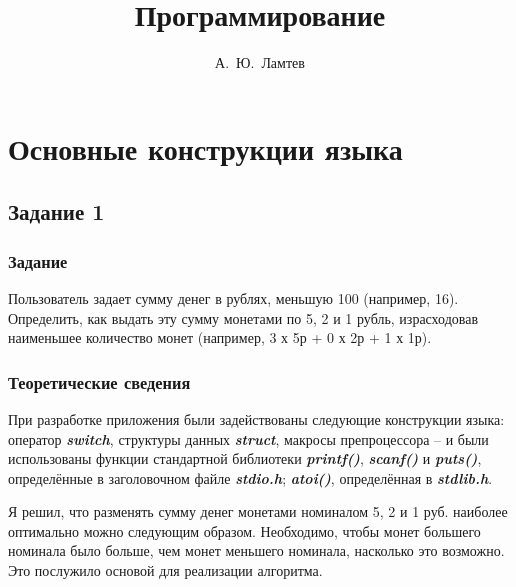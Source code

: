 \documentclass[12pt,a4paper]{report}
\author{А.~Ю.~Ламтев}
\title{Программирование}
\begin{document}
\maketitle
\chapter{Основные конструкции языка}
\section{Задание 1}
\subsection{Задание}
Пользователь задает сумму денег в рублях, меньшую 100 (например, 16). Определить, как выдать эту сумму монетами по 5, 2 и 1 рубль, израсходовав наименьшее количество монет (например, 3 х 5р + 0 х 2р + 1 х 1р).
\subsection{Теоретические сведения}

	При разработке приложения были задействованы следующие конструкции языка: оператор \textbf{\textit{switch}}, структуры данных \textbf{\textit{struct}}, макросы препроцессора -- и были использованы функции стандартной библиотеки \textbf{\textit{printf()}}, \textbf{\textit{scanf()}} и \textbf{\textit{puts()}}, определённые в заголовочном файле \textbf{\textit{stdio.h}}; \textbf{\textit{atoi()}}, определённая в \textbf{\textit{stdlib.h}}. 

Я решил, что разменять сумму денег монетами номиналом 5, 2 и 1 руб. наиболее оптимально можно следующим образом. Необходимо, чтобы монет большего номинала было больше, чем монет меньшего номинала, насколько это возможно. Это послужило основой для реализации алгоритма.
\end{document}
